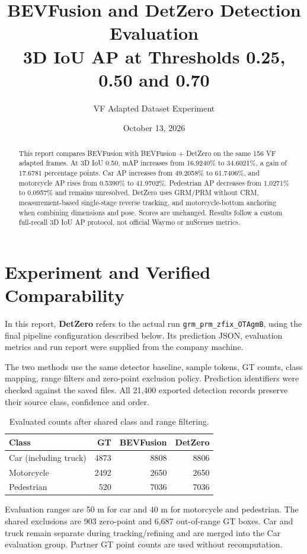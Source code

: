 \documentclass[a4paper,11pt]{article}
\title{BEVFusion and DetZero Detection Evaluation\\\large 3D IoU AP at Thresholds 0.25, 0.50 and 0.70}
\author{VF Adapted Dataset Experiment}
\date{October 13, 2026}
\begin{document}
\maketitle
\begin{abstract}
This report compares BEVFusion with BEVFusion + DetZero on the same 156 VF adapted frames. At 3D IoU 0.50, mAP increases from 16.9240\% to 34.6021\%, a gain of 17.6781 percentage points. Car AP increases from 49.2058\% to 61.7406\%, and motorcycle AP rises from 0.5390\% to 41.9702\%. Pedestrian AP decreases from 1.0271\% to 0.0957\% and remains unresolved. DetZero uses GRM/PRM without CRM, measurement-based single-stage reverse tracking, and motorcycle-bottom anchoring when combining dimensions and pose. Scores are unchanged. Results follow a custom full-recall 3D IoU AP protocol, not official Waymo or nuScenes metrics.
\end{abstract}

\section{Experiment and Verified Comparability}
In this report, \textbf{DetZero} refers to the actual run \texttt{grm\_prm\_zfix\_OTAgmB}, using the final pipeline configuration described below. Its prediction JSON, evaluation metrics and run report were supplied from the company machine.

The two methods use the same detector baseline, sample tokens, GT counts, class mapping, range filters and zero-point exclusion policy. Prediction identifiers were checked against the saved files. All 21,400 exported detection records preserve their source class, confidence and order.

\begin{table}[H]\centering\small
\caption{Evaluated counts after shared class and range filtering.}
\begin{tabular}{lrrr}\toprule
Class & GT & BEVFusion & DetZero \\
\midrule
Car (including truck) & 4873 & 8808 & 8806 \\
Motorcycle & 2492 & 2650 & 2650 \\
Pedestrian & 520 & 7036 & 7036 \\
\bottomrule\end{tabular}\end{table}
Evaluation ranges are 50 m for car and 40 m for motorcycle and pedestrian. The shared exclusions are 903 zero-point and 6,687 out-of-range GT boxes. Car and truck remain separate during tracking/refining and are merged into the Car evaluation group. Partner GT point counts are used without recomputation.
\end{document}
